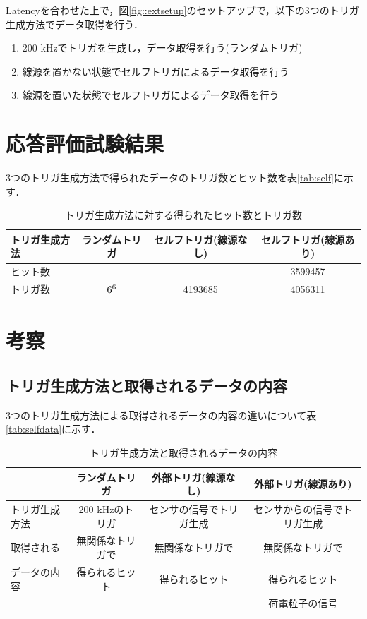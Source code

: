 Latencyを合わせた上で，図\ref{fig::extsetup}のセットアップで，以下の3つのトリガ生成方法でデータ取得を行う．
\begin{enumerate}
\item 200 $\mathrm{kHz}$でトリガを生成し，データ取得を行う(ランダムトリガ)
\item 線源を置かない状態でセルフトリガによるデータ取得を行う
\item 線源を置いた状態でセルフトリガによるデータ取得を行う
\end{enumerate}


\section{応答評価試験結果}
\label{sec:extconc}
3つのトリガ生成方法で得られたデータのトリガ数とヒット数を表\ref{tab:self}に示す．

\begin{table}[h]
  \centering
  \caption{トリガ生成方法に対する得られたヒット数とトリガ数}
  \begin{tabular} {l|ccc} \hline
    トリガ生成方法 & ランダムトリガ & セルフトリガ(線源なし) & セルフトリガ(線源あり) \\ \hline
    ヒット数 & & & 3599457 \\
    トリガ数 & $6 \time 10^6$ & 4193685 & 4056311 \\ \hline
  \end{tabular}
  \label{tab:selfpara}
\end{table}

\section{考察}
\subsection*{トリガ生成方法と取得されるデータの内容}
3つのトリガ生成方法による取得されるデータの内容の違いについて表\ref{tab:selfdata}に示す．

\begin{table}[h]
  \centering
  \caption{トリガ生成方法と取得されるデータの内容}
  \begin{tabular} {l|ccc} \hline
    & ランダムトリガ & 外部トリガ(線源なし) & 外部トリガ(線源あり) \\ \hline
    トリガ生成方法 & 200 $\mathrm{kHz}$のトリガ & センサの信号でトリガ生成 & センサからの信号でトリガ生成 \\ \hline
    取得される & 無関係なトリガで & 無関係なトリガで & 無関係なトリガで\\
    データの内容 & 得られるヒット & 得られるヒット & 得られるヒット \\
    & & & 荷電粒子の信号\\ \hline
  \end{tabular}
  \label{tab:extdata}
\end{table}

